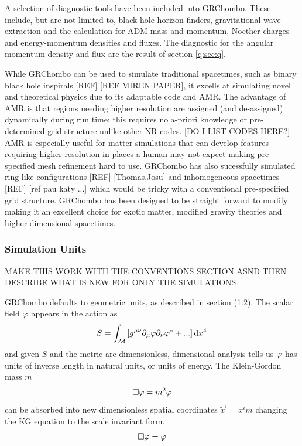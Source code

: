 A selection of diagnostic tools have been included into GRChombo. These include, but are not limited to, black hole horizon finders, gravitational wave extraction and the calculation for ADM mass and momentum, Noether charges and energy-momentum densities and fluxes. The diagnostic for the angular momentum density and flux are the result of section \ref{q:sec:q}.


While GRChombo can be used to simulate traditional spacetimes, such as binary black hole inspirals [REF] [REF MIREN PAPER], it excells at simulating novel and theoretical physics due to its adaptable code and AMR. The advantage of AMR is that regions needing higher resolution are assigned (and de-assigned) dynamically during run time; this requires no a-priori knowledge or pre-determined grid structure unlike other NR codes. [DO I LIST CODES HERE?] AMR is especially useful for matter simulations that can develop features requiring higher resolution in places a human may not expect making pre-specified mesh refinement hard to use. GRChombo has also sucessfully simulated ring-like configurations [REF] [Thomas,Josu] and inhomogeneous spacetimes [REF] [ref pau katy ...] which would be tricky with a conventional pre-specified grid structure. GRChombo has been designed to be straight forward to modify making it an excellent choice for exotic matter, modified gravity theories and higher dimensional spacetimes.


\subsubsection{Simulation Units}
MAKE THIS WORK WITH THE CONVENTIONS SECTION ASND THEN DESCRIBE WHAT IS NEW FOR ONLY THE SIMULATIONS

GRChombo defaults to geometric units, as described in section (1.2). The scalar field $\varphi$ appears in the action as
\begin{equation} S = \int_{\mathcal{M}} \left[g^{\mu\nu}\partial_\mu \varphi \partial_\nu \varphi^* + ... \right]\dd x^4\end{equation}
and given $S$ and the metric are dimensionless, dimensional analysis tells us $\varphi$ has units of inverse length in natural units, or units of energy. The Klein-Gordon mass $m$
\begin{equation} \Box \varphi = m^2 \varphi\end{equation}
can be absorbed into new dimensionless spatial coordinates $\tilde{x}^i = x^i m$ changing the KG equation to the scale invariant form.
\begin{equation} \Box \varphi = \varphi\end{equation}




